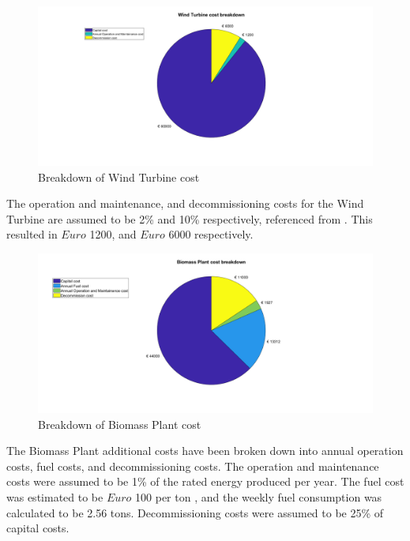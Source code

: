 \begin{figure}[H]
    \centering
    \includegraphics[width=1.1 \linewidth]{Final_report/Images/wtcost.png}
    \caption{Breakdown of Wind Turbine cost}
    \label{fig:w}
\end{figure}

\noindent The operation and maintenance, and decommissioning costs for the Wind Turbine are assumed to be 2\% and 10\% respectively, referenced from \citep{Weu2017}. This resulted in $ Euro $ 1200, and $ Euro $ 6000 respectively. 

\begin{figure}[H]
    \centering
    \includegraphics[width=1.1 \linewidth]{Final_report/Images/bmcost.png}
    \caption{Breakdown of Biomass Plant cost}
    \label{fig:b}
\end{figure}

\noindent The Biomass Plant additional costs have been broken down into annual operation costs, fuel costs, and decommissioning costs. The operation and maintenance costs were assumed to be 1\% of the rated energy produced per year. The fuel cost was estimated to be $ Euro $ 100 per ton \citep{beets_2017}, and the weekly fuel consumption was calculated to be 2.56 tons. Decommissioning costs were assumed to be 25\% of capital costs.

